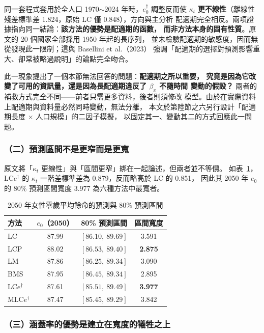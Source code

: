 \documentclass[UTF8, fontset=macnew, a4paper, 12pt]{ctexart}
\newcommand{\edag}{e_0^{\dagger}}
\newcommand{\LCe}{\mathrm{LC}e^{\dagger}}
\begin{document}
同一套程式套用於全人口 1970$\sim$2024 年時，$\edag$ 調整反而使 $\kappa_t$
\textbf{更不線性}（離線性殘差標準差 1.824，原始 LC 僅 0.848），方向與主分析
配適期完全相反。兩項證據指向同一結論：\textbf{該方法的優勢是配適期的函數，
而非方法本身的固有性質}。原文的 20 個國家全部採用 1950 年起的長序列，
並未檢驗配適期的敏感度，因而無從發現此一限制；這與 Basellini et al.（2023）
強調「配適期的選擇對預測影響重大、卻常被略過說明」的論點完全吻合。

此一現象提出了一個本節無法回答的問題：\textbf{配適期之所以重要，
究竟是因為它改變了可用的資訊量，還是因為長配適期違反了 $\beta_x$ 不隨時間
變動的假設？} 兩者的補救方式完全不同——前者只需更多資料，後者則須修改
模型。由於在實際資料上配適期與資料量必然同時變動，無法分離，
本文於第陸節之六另行設計「配適期長度 $\times$ 人口規模」的二因子模擬，
以固定其一、變動其二的方式回應此一問題。

\subsubsection{（二）預測區間不是更窄而是更寬}

原文將「$\kappa_t$ 更線性」與「區間更窄」綁在一起論述，但兩者並不等價。
如表~\ref{tab:e0}，$\LCe$ 的 $\kappa_t$ 一階差標準差為 0.879，反而略高於 LC 的 0.851，
因此其 2050 年 $e_0$ 的 80\% 預測區間寬度 3.977 為六種方法中最寬者。

\begin{table}[H]
\centering
\caption{2050 年女性零歲平均餘命的預測與 80\% 預測區間}
\small
\begin{tabular}{lccc}
\toprule
方法 & $e_0$（2050） & 80\% 預測區間 & 區間寬度\\
\midrule
LC      & 87.99 & $[86.10,\ 89.69]$ & 3.591\\
LCP     & 88.02 & $[86.53,\ 89.40]$ & \textbf{2.875}\\
LM      & 87.86 & $[86.25,\ 89.34]$ & 3.090\\
BMS     & 87.95 & $[86.45,\ 89.34]$ & 2.895\\
$\LCe$  & 87.61 & $[85.51,\ 89.49]$ & \textbf{3.977}\\
M$\LCe$ & 87.47 & $[85.45,\ 89.29]$ & 3.842\\
\bottomrule
\end{tabular}
\label{tab:e0}
\end{table}

\subsubsection{（三）涵蓋率的優勢是建立在寬度的犧牲之上}
\end{document}
